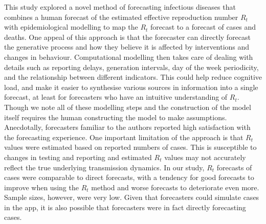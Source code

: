 \documentclass[10pt,a4paper,twocolumn]{article}
\begin{document}
This study explored a novel method of forecasting infectious diseases that combines a human forecast of the estimated effective reproduction number $R_t$ with epidemiological modelling to map the $R_t$ forecast to a forecast of cases and deaths. One appeal of this approach is that the forecaster can directly forecast the generative process and how they believe it is affected by interventions and changes in behaviour. Computational modelling then takes care of dealing with details such as reporting delays, generation intervals, day of the week periodicity, and the relationship between different indicators. This could help reduce cognitive load, and make it easier to synthesise various sources in information into a single forecast, at least for forecasters who have an intuitive understanding of $R_t$. Though we note all of these modelling steps and the construction of the model itself requires the human constructing the model to make assumptions. Anecdotally, forecasters familiar to the authors reported high satisfaction with the forecasting experience. One important limitation of the approach is that $R_t$ values were estimated based on reported numbers of cases. This is susceptible to changes in testing and reporting and estimated $R_t$ values may not accurately reflect the true underlying transmission dynamics.
In our study, $R_t$ forecasts of cases were comparable to direct forecasts, with a tendency for good forecasts to improve when using the $R_t$ method and worse forecasts to deteriorate even more. Sample sizes, however, were very low. 
Given that forecasters could simulate cases in the app, it is also possible that forecasters were in fact directly forecasting cases. 
\end{document}
